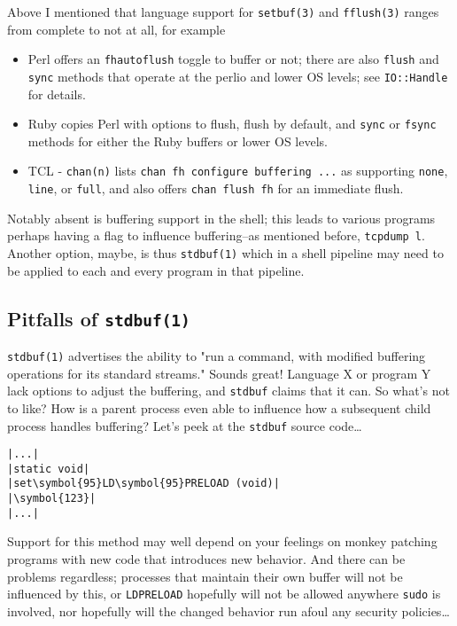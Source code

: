 \documentclass[10pt,a4paper]{article}
\begin{document}
Above I mentioned that language support for \texttt{setbuf(3)} and
\texttt{fflush(3)} ranges from complete to not at all, for example

\begin{itemize}
\item Perl offers an \texttt{fhautoflush} toggle to buffer or not; there are also \texttt{flush} and \texttt{sync} methods that operate at the perlio and lower OS levels; see \texttt{IO::Handle} for details.
\item Ruby copies Perl with options to flush, flush by default, and \texttt{sync} or \texttt{fsync} methods for either the Ruby buffers or lower OS levels.
\item TCL - \texttt{chan(n)} lists \texttt{chan fh configure buffering ...} as supporting \texttt{none}, \texttt{line}, or \texttt{full}, and also offers \texttt{chan flush fh} for an immediate flush.
\end{itemize}

Notably absent is buffering support in the shell; this leads to various
programs perhaps having a flag to influence buffering--as mentioned
before, \texttt{tcpdump l}. Another option, maybe, is thus
\texttt{stdbuf(1)} which in a shell pipeline may need to be applied to
each and every program in that pipeline.

\subsection*{Pitfalls of \texttt{stdbuf(1)}}

\texttt{stdbuf(1)} advertises the ability to "run a command, with
modified buffering operations for its standard streams." Sounds great!
Language X or program Y lack options to adjust the buffering, and
\texttt{stdbuf} claims that it can. So what's not to like? How is a
parent process even able to influence how a subsequent child process
handles buffering? Let's peek at the \texttt{stdbuf} source code\ldots

\begin{lstlisting}
|...|
|static void|
|set\symbol{95}LD\symbol{95}PRELOAD (void)|
|\symbol{123}|
|...|
\end{lstlisting}

Support for this method may well depend on your feelings on monkey
patching programs with new code that introduces new behavior. And there
can be problems regardless; processes that maintain their own buffer
will not be influenced by this, or \texttt{LDPRELOAD}
hopefully will not be allowed anywhere \texttt{sudo} is involved, nor
hopefully will the changed behavior run afoul any security
policies\ldots
\end{document}
